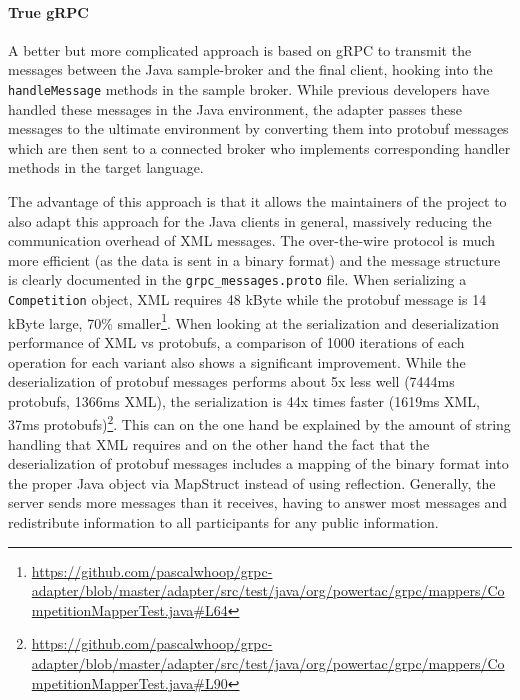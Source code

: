 \paragraph{True gRPC}%
\label{sub:grpc_based_communication}

A better but more complicated approach is based on \ac{gRPC} to transmit the messages between the Java sample-broker and
the final client, hooking into the \texttt{handleMessage} methods in the sample broker.
While previous developers have handled these messages in the Java environment, the adapter passes these messages to the ultimate
environment by converting them into protobuf messages which are then sent to a connected broker who implements
corresponding handler methods in the target language.

The advantage of this approach is that it allows the maintainers of the project to also adapt this approach for the
Java clients in general, massively reducing the communication overhead of \ac{XML} messages. The over-the-wire protocol
is much more
efficient (as the data is sent in a binary format) and the message structure is clearly documented in the
\texttt{grpc\_messages.proto} file. When serializing a \texttt{Competition} object, \ac{XML} requires 48 kByte while
the protobuf message is 14 kByte large, 70\%
smaller\footnote{\url{https://github.com/pascalwhoop/grpc-adapter/blob/master/adapter/src/test/java/org/powertac/grpc/mappers/CompetitionMapperTest.java\#L64}}.
When looking at the serialization and deserialization performance of \ac{XML} vs protobufs, a comparison of 1000
iterations of each operation for each variant also shows a significant improvement. While the deserialization of
protobuf messages performs about 5x less well (7444ms protobufs, 1366ms \ac{XML}), the serialization is 44x times
faster (1619ms \ac{XML}, 37ms
protobufs)\footnote{\url{https://github.com/pascalwhoop/grpc-adapter/blob/master/adapter/src/test/java/org/powertac/grpc/mappers/CompetitionMapperTest.java\#L90}}.
This can on the one hand be explained by the amount of string handling that \ac{XML} requires and on the other hand the fact that the
deserialization of protobuf messages includes a mapping of the binary format into the proper Java object via MapStruct instead
of using reflection. Generally, the server sends more messages than it receives, having to answer most messages and
redistribute information to all participants for any public information.


